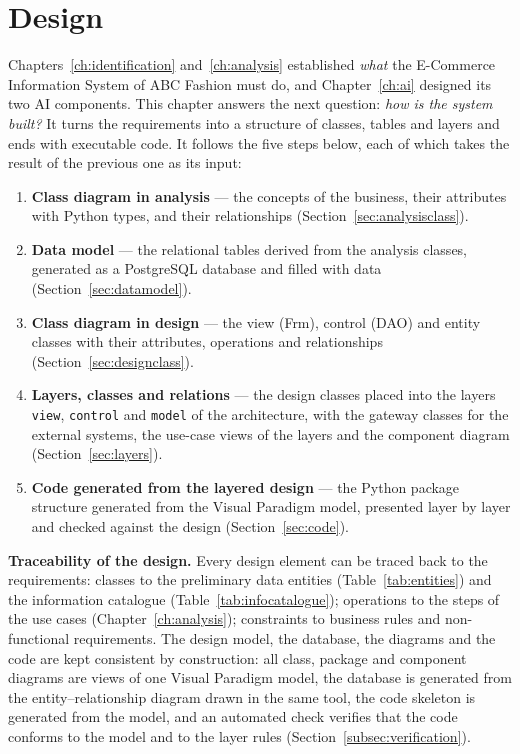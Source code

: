 \chapter{Design}
\label{ch:design}
\sloppy

Chapters~\ref{ch:identification} and~\ref{ch:analysis} established \emph{what} the E-Commerce Information System of ABC Fashion must do, and Chapter~\ref{ch:ai} designed its two AI components. This chapter answers the next question: \emph{how is the system built?} It turns the requirements into a structure of classes, tables and layers and ends with executable code. It follows the five steps below, each of which takes the result of the previous one as its input:

\begin{enumerate}[label=\textbf{4.\arabic*}]
  \item \textbf{Class diagram in analysis} --- the concepts of the business, their attributes with Python types, and their relationships (Section~\ref{sec:analysisclass}).
  \item \textbf{Data model} --- the relational tables derived from the analysis classes, generated as a PostgreSQL database and filled with data (Section~\ref{sec:datamodel}).
  \item \textbf{Class diagram in design} --- the view (\textsf{Frm}), control (\textsf{DAO}) and entity classes with their attributes, operations and relationships (Section~\ref{sec:designclass}).
  \item \textbf{Layers, classes and relations} --- the design classes placed into the layers \texttt{view}, \texttt{control} and \texttt{model} of the architecture, with the gateway classes for the external systems, the use-case views of the layers and the component diagram (Section~\ref{sec:layers}).
  \item \textbf{Code generated from the layered design} --- the Python package structure generated from the Visual Paradigm model, presented layer by layer and checked against the design (Section~\ref{sec:code}).
\end{enumerate}

\textbf{Traceability of the design.} Every design element can be traced back to the requirements: classes to the preliminary data entities (Table~\ref{tab:entities}) and the information catalogue (Table~\ref{tab:infocatalogue}); operations to the steps of the use cases (Chapter~\ref{ch:analysis}); constraints to business rules and non-functional requirements. The design model, the database, the diagrams and the code are kept consistent by construction: all class, package and component diagrams are views of one Visual Paradigm model, the database is generated from the entity--relationship diagram drawn in the same tool, the code skeleton is generated from the model, and an automated check verifies that the code conforms to the model and to the layer rules (Section~\ref{subsec:verification}).

